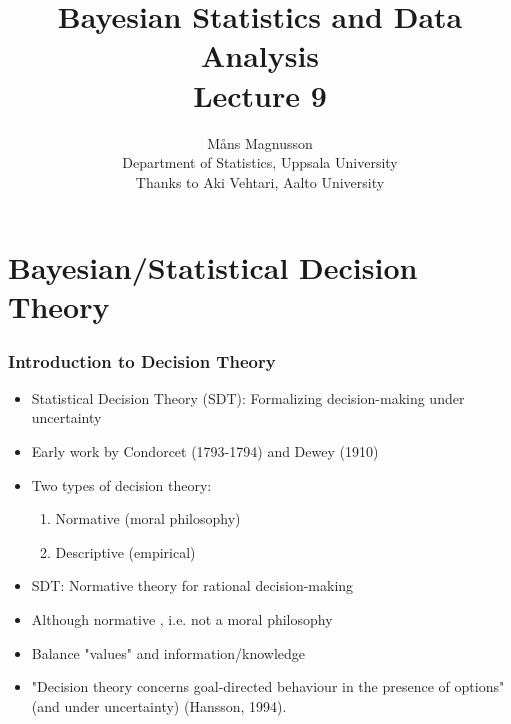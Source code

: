 \documentclass[10pt]{beamer}
\title[]{{\color{black}Bayesian Statistics and Data Analysis \\ Lecture 9}}
\author[]{M{\aa}ns Magnusson \\ Department of Statistics, Uppsala University \\ Thanks to Aki Vehtari, Aalto University}
\date{}
\begin{document}
\frame{\titlepage
}



\section{Bayesian/Statistical Decision Theory}
\frame{\sectionpage}


\begin{frame}
\frametitle{Introduction to Decision Theory}

\begin{itemize}
  \item Statistical Decision Theory (SDT): Formalizing decision-making under uncertainty
  \pause
  \item Early work by Condorcet (1793-1794) and Dewey (1910)
  \item Two types of decision theory:
  \begin{enumerate}
      \item Normative (moral philosophy)
  \pause
      \item Descriptive (empirical)
  \pause
  \end{enumerate}
  \item SDT: Normative theory for rational decision-making
  \pause
  \item Although normative , i.e. not a moral philosophy
  \pause
  \item Balance "values" and information/knowledge
    \pause
  \item "Decision theory concerns goal-directed behaviour in the presence of options" (and under uncertainty) (Hansson, 1994).

\end{itemize}

\end{frame}
\end{document}
